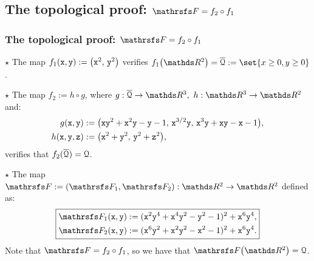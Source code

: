 \documentclass{beamer}
\begin{document}
\subsection{The topological proof: $\FFF=f_2\circ f_1$}
\begin{frame}
\frametitle{The topological proof: $\FFF=f_2\circ f_1$} 
$\star$ The map $f_1({\tt x},{\tt y}):=\big({\tt x}^2,\,{\tt y}^2\big)$ verifies $f_1\big(\R^2\big)=\overline{\Qu}:=\set{x\ge 0,y\ge 0}$.
\vspace{0.5cm}

$\star$ The map $f_2:=h\circ g$, where $g:\overline{\Qu}\to\R^3,\ h:\R^3\to\R^2$ and:%
\begin{align*}
g({\tt x},{\tt y})&:=\big({\tt x}{\tt y}^2+{\tt x}^2{\tt y}-{\tt y}-1,\,{\tt x}^{3/2}{\tt y},\,{\tt x}^3{\tt y}+{\tt x}{\tt y}-{\tt x}-1\big),\\
h({\tt x},{\tt y},{\tt z})&:=\big({\tt x}^2+{\tt y}^2,\,{\tt y}^2+{\tt z}^2\big),
\end{align*}%
verifies that $f_2(\overline{\mathcal{Q}}) = \mathcal{Q}$.
\vspace{0.5cm}

$\star$ The map $\FFF:= (\FFF_1, \FFF_2):\R^2\to\R^2$ defined as:
\begin{equation*}\label{eq:thirdMap}
\boxed{
\begin{aligned}
\FFF_1({\tt x}, {\tt y}) := ({\tt x}^2{\tt y}^4+{\tt x}^4{\tt y}^2-{\tt y}^2-1)^2+{\tt x}^6{\tt y}^4,\\
\FFF_2(\x, \y) := ({\tt x}^6{\tt y}^2+{\tt x}^2{\tt y}^2-{\tt x}^2-1)^2+{\tt x}^6{\tt y}^4.
\end{aligned}
}
\end{equation*}
Note that $\FFF = f_2 \circ f_1$, so we have that $\FFF\big(\R^2\big) = \Qu$.
\end{frame}
\end{document}
